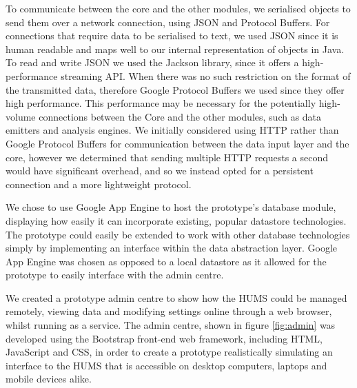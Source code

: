 \documentclass[10pt,a4paper]{article}
\begin{document}
To communicate between the core and the other modules, we serialised 
objects to send them over a network connection, using JSON and 
Protocol Buffers. For connections that require data to be serialised to text, 
we used JSON since it is human readable and maps well to our internal 
representation of objects in Java. To read and write JSON we used the 
Jackson library, since it offers a high-performance streaming API. When 
there was no such restriction on the format of the transmitted data, 
therefore Google Protocol Buffers we used since they offer high 
performance. This performance may be necessary for the potentially 
high-volume connections between the Core and the other modules, 
such as data emitters and analysis engines. We initially considered 
using HTTP rather than Google Protocol Buffers for communication 
between the data input layer and the core, however we determined
that sending multiple HTTP requests a second would have significant 
overhead, and so we instead opted for a persistent connection and a 
more lightweight protocol.

We chose to use Google App Engine to host the prototype's database
module, displaying how easily it can incorporate existing, popular
datastore technologies. The prototype could easily be extended to
work with other database technologies simply by implementing an
interface within the data abstraction layer. Google App Engine was chosen
as opposed to a local datastore as it allowed for the prototype to
easily interface with the admin centre.

We created a prototype admin centre to show how the HUMS could be
managed remotely, viewing data and modifying settings online through
a web browser, whilst running as a service. The admin centre, shown in figure \ref{fig:admin} was
developed using the Bootstrap front-end web framework, including 
HTML, JavaScript and CSS, in order to create a prototype realistically
simulating an interface to the HUMS that is accessible on desktop
computers, laptops and mobile devices alike.
\end{document}
